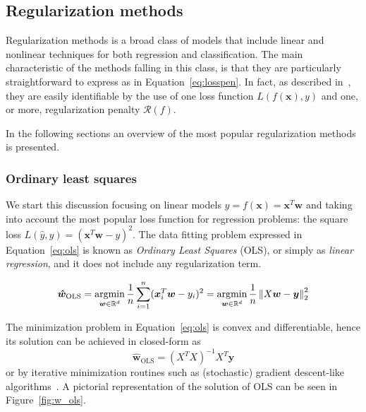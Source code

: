 	    \subsection{Regularization methods} \label{subsec:regularization_methods}
	    Regularization methods is a broad class of models that include linear and nonlinear techniques for both regression and classification. The main characteristic of the methods falling in this class, is that they are particularly straightforward to express as in Equation~\eqref{eq:losspen}. In fact, as described in~\cite{evgeniou2000regularization}, they are easily identifiable by the use of one loss function $L(f(\bm{x}), y)$ and one, or more, regularization penalty $\mathcal{R}(f)$.

	    In the following sections an overview of the most popular regularization methods is presented.

			\subsubsection{Ordinary least squares} \label{sec:ols}
			We start this discussion focusing on linear models $\hat y = f(\bm{x})=\bm{x}^T\bm{w}$ and taking into account the most popular loss function for regression problems: the square loss $L(\hat y, y) = (\bm{x}^T\bm{w}-y)^2$. The data fitting problem expressed in Equation~\eqref{eq:ols} is known as \textit{Ordinary Least Squares} (\ac{OLS}), or simply as \textit{linear regression}, and it does not include any regularization term.

			\begin{equation} \label{eq:ols}
				\bm{\hat w}_{\text{OLS}} = \mathop{\mathrm{argmin}}\limits_{\bm{w} \in \mathbb{R}^d} \frac{1}{n} \sum_{i=1}^n (\bm{x}_i^T\bm{w} - y_i)^2 = \mathop{\mathrm{argmin}}\limits_{\bm{w} \in \mathbb{R}^d} \frac{1}{n} \left\lVert X\bm{w} - \bm{y}\right\rVert_2^2
			\end{equation}

			The minimization problem in Equation~\eqref{eq:ols} is convex and differentiable, hence its solution can be achieved in closed-form as
			$$
				\bm{\hat w}_{\text{OLS}} = (X^TX)^{-1}X^T\bm{y}
			$$
			or by iterative minimization routines such as (stochastic) gradient descent-like algorithms~\cite{boyd2004convex, sra2012optimization}. A pictorial representation of the solution of OLS can be seen in Figure~\ref{fig:w_ols}.

